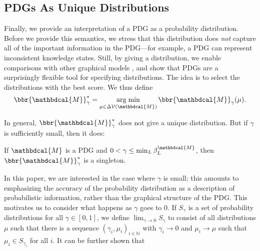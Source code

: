 \documentclass[letterpaper]{article} %
\theoremstyle{plain}
\theoremstyle{definition}
\theoremstyle{remark}
\newcommand{\begthm}[3][]{\begin{#2}[{name=#1},restate=#3,label=#3]}
\DeclareMathOperator*{\argmin}{arg\;min}
\newcommand{\V}{\mathcal V}
\newcommand{\dg}[1]{\mathbdcal{#1}}
\begin{document}
\subsection{PDGs As Unique Distributions}\label{sec:uniq-dist-semantics}

Finally, we provide an interpretation of a PDG as a probability distribution.
Before we provide this semantics, we stress that this distribution does
\emph{not} capture all of the important information in the PDG---for example, a
PDG can represent inconsistent knowledge states.  Still, by giving a
distribution, we enable comparisons with other graphical models%
, and show that PDGs are
a surprisingly flexible tool for specifying distributions.  
The idea is to select the distributions with the best score. 
We thus define 
\begin{equation}
	\bbr{\dg M}_\gamma^* = \argmin_{\mu \in \Delta\V(\dg M)} \bbr{\dg M}_\gamma(\mu).
\end{equation}   

In general, $\bbr{\dg M}_\gamma^*$ does not give a unique distribution.  But if
$\gamma$ is sufficiently small, then it does:

\begthm{prop}{prop:sem3}
	If $\dg M$ is a PDG and $0 < \gamma \leq \min_L \beta_L^{\dg M}$, then
	$\bbr{\dg M}_\gamma^*$ is a singleton. 
\end{prop}

In this paper, we are interested in the case where $\gamma$ is small;
this amounts to emphasizing the accuracy of the probability
distribution as a description of probabilistic information,
rather than the graphical structure of the PDG.  
This motivates us to consider
what happens as $\gamma$ goes to 0.  If $S_\gamma$ is a set of
probability distributions for all $\gamma \in [0,1]$, we define $\lim_{\gamma
\rightarrow 0} S_\gamma$ to consist of all distributions $\mu$ such that there
is a sequence $(\gamma_i, \mu_i)_{i \in \mathbb N}$ with $\gamma_i \to 0$ and
$\mu_i \to \mu$ such that $\mu_i \in S_{\gamma_i}$ for all $i$. 
It can be further shown that 
\end{document}

